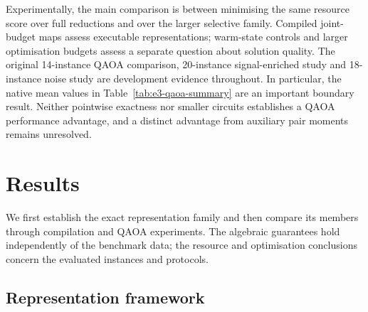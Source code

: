 \documentclass[a4paper,onecolumn,11pt,unpublished]{quantumarticle}
\theoremstyle{remark}
\begin{document}
Experimentally, the main comparison is between minimising the same resource score over full reductions and over the larger selective family. Compiled joint-budget maps assess executable representations; warm-state controls and larger optimisation budgets assess a separate question about solution quality. The original 14-instance QAOA comparison, 20-instance signal-enriched study and 18-instance noise study are development evidence throughout. In particular, the native mean values in Table~\ref{tab:e3-qaoa-summary} are an important boundary result. Neither pointwise exactness nor smaller circuits establishes a QAOA performance advantage, and a distinct advantage from auxiliary pair moments remains unresolved.

\section{Results}
\label{sec:results}

We first establish the exact representation family and then compare its
members through compilation and QAOA experiments. The algebraic guarantees
hold independently of the benchmark data; the resource and optimisation
conclusions concern the evaluated instances and protocols.

\subsection{Representation framework}
\label{sec:preliminaries}
\label{sec:pb-diagonal}
\label{sec:pointwise-exactness}
\label{sec:resource-relaxation-data}
\end{document}

